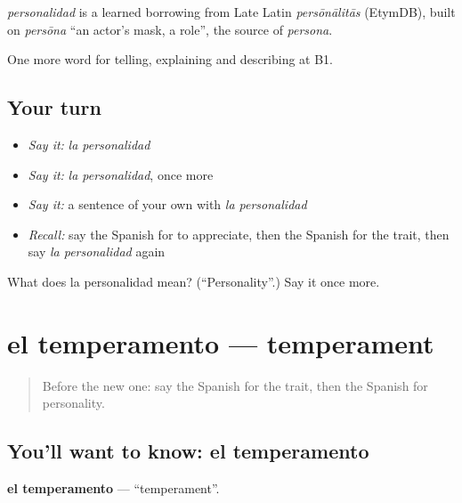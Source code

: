 \begin{cousinweb}
\emph{personalidad} is a learned borrowing from Late Latin \emph{persōnālitās} (EtymDB), built on \emph{persōna} \textquotedblleft{}an actor's mask, a role\textquotedblright{}, the source of \emph{persona}.
\end{cousinweb}

\begin{grammarlens}[title={What you've built}]
One more word for telling, explaining and describing at B1.
\end{grammarlens}

\subsection*{Your turn}
\begin{itemize}
\raggedright
  \item \emph{Say it:} \emph{la personalidad}
  \item \emph{Say it:} \emph{la personalidad}, once more
  \item \emph{Say it:} a sentence of your own with \emph{la personalidad}
  \item \emph{Recall:} say the Spanish for to appreciate, then the Spanish for the trait, then say \emph{la personalidad} again
\end{itemize}

\begin{tcolorbox}[breakable,colback=teal!4,colframe=teal!35!black,title={Before you move on}]
What does la personalidad mean? (\textquotedblleft{}Personality\textquotedblright{}.) Say it once more.
\end{tcolorbox}
\section[el temperamento]{el temperamento — temperament}

\label{lesson:ES-C721-temperamento}



\begin{quote}
Before the new one: say the Spanish for the trait, then the Spanish for personality.
\end{quote}

\subsection*{You'll want to know: el temperamento}
\textbf{el temperamento} — \textquotedblleft{}temperament\textquotedblright{}.

